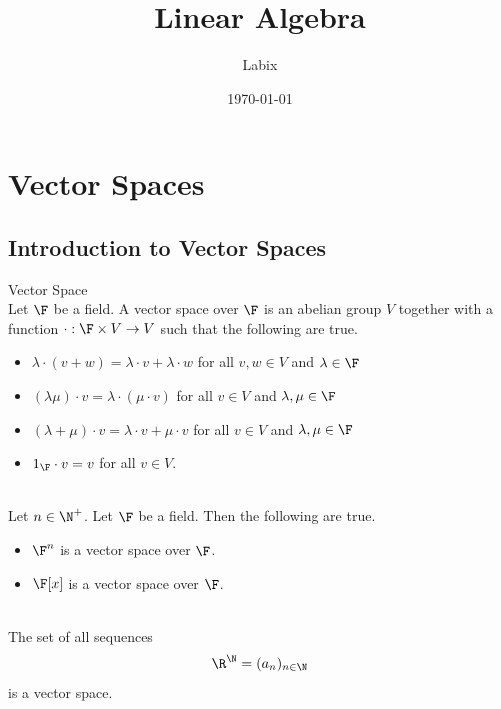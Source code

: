 \documentclass[a4paper]{article}
\title{Linear Algebra}
\author{Labix}
\date{\today}
\begin{document}
\maketitle

\pagebreak
\tableofcontents
\pagebreak

\section{Vector Spaces}
\subsection{Introduction to Vector Spaces}
\begin{defn}{Vector Space}{}\\
Let $\F$ be a field. A vector space over $\F$ is an abelian group $V$ together with a function $\cdot:\F\times V\to V$ such that the following are true. 
\begin{itemize}
\item $\lambda\cdot(v+w)=\lambda\cdot v+\lambda\cdot w$ for all $v,w\in V$ and $\lambda\in\F$
\item $(\lambda\mu)\cdot v=\lambda\cdot(\mu\cdot v)$ for all $v\in V$ and $\lambda,\mu\in\F$
\item $(\lambda+\mu)\cdot v=\lambda\cdot v+\mu\cdot v$ for all $v\in V$ and $\lambda,\mu\in\F$
\item $1_\F\cdot v=v$ for all $v\in V$. 
\end{itemize}
\end{defn}

\begin{eg}{}{}\\
Let $n\in\N^+$. Let $\F$ be a field. Then the following are true. 
\begin{itemize}
\item $\F^n$ is a vector space over $\F$. 
\item $\F[x]$ is a vector space over $\F$. 
\end{itemize}
\end{eg}

\begin{eg}{}{}\\
The set of all sequences $$\R^\N=(a_n)_{n\in\N}$$ is a vector space. 
\end{eg}
\end{document}
